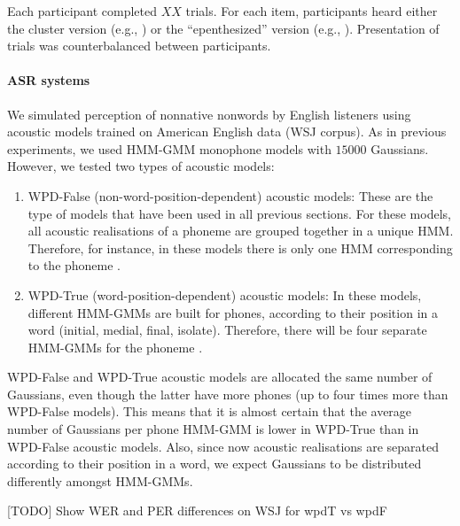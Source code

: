 {Each participant completed {\color{red}$XX$} trials. For each item, participants heard either the cluster version (e.g., ) or the ``epenthesized'' version (e.g., ). Presentation of trials was counterbalanced between participants.   


\paragraph{ASR systems}
We simulated perception of nonnative nonwords by English listeners using acoustic models trained on American English data (WSJ corpus). As in previous experiments, we used HMM-GMM monophone models with $15000$ Gaussians. However, we tested two types of acoustic models:

\begin{enumerate}
\item WPD-False (non-word-position-dependent) acoustic models: These are the type of models that have been used in all previous sections. For these models, all acoustic realisations of a phoneme are grouped together in a unique HMM. Therefore, for instance, in these models there is only one HMM corresponding to the phoneme .
  \item WPD-True (word-position-dependent) acoustic models: In these models, different HMM-GMMs are built for phones, according to their position in a word (initial, medial, final, isolate). Therefore, there will be four separate HMM-GMMs for the phoneme .  
\end{enumerate}

WPD-False and WPD-True acoustic models are allocated the same number of Gaussians, even though the latter have more phones (up to four times more than WPD-False models). This means that it is almost certain that the average number of Gaussians per phone HMM-GMM is lower in WPD-True than in WPD-False acoustic models. Also, since now acoustic realisations are separated according to their position in a word, we expect Gaussians to be distributed differently amongst HMM-GMMs.

{\color{red}[TODO] Show WER and PER differences on WSJ for wpdT vs wpdF}

}
